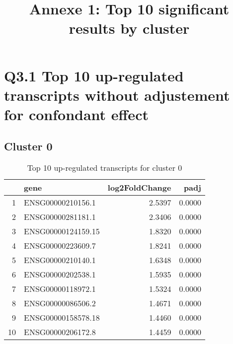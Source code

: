 \documentclass{article}
\begin{document}
\title{Annexe 1: Top 10 significant results by cluster}
\maketitle
\tableofcontents
\newpage
\section{Q3.1 Top 10 up-regulated transcripts without adjustement for confondant effect}
\subsection{Cluster 0 }
\begin{table}[H]
\centering
\begin{tabular}{rlrr}
  \hline
 & gene & log2FoldChange & padj \\ 
  \hline
1 & ENSG00000210156.1 & 2.5397 & 0.0000 \\ 
  2 & ENSG00000281181.1 & 2.3406 & 0.0000 \\ 
  3 & ENSG00000124159.15 & 1.8320 & 0.0000 \\ 
  4 & ENSG00000223609.7 & 1.8241 & 0.0000 \\ 
  5 & ENSG00000210140.1 & 1.6348 & 0.0000 \\ 
  6 & ENSG00000202538.1 & 1.5935 & 0.0000 \\ 
  7 & ENSG00000118972.1 & 1.5324 & 0.0000 \\ 
  8 & ENSG00000086506.2 & 1.4671 & 0.0000 \\ 
  9 & ENSG00000158578.18 & 1.4460 & 0.0000 \\ 
  10 & ENSG00000206172.8 & 1.4459 & 0.0000 \\ 
   \hline
\end{tabular}
\caption{Top 10 up-regulated transcripts for cluster 0} 
\label{tab:q3_1_0}
\end{table}
\end{document}
